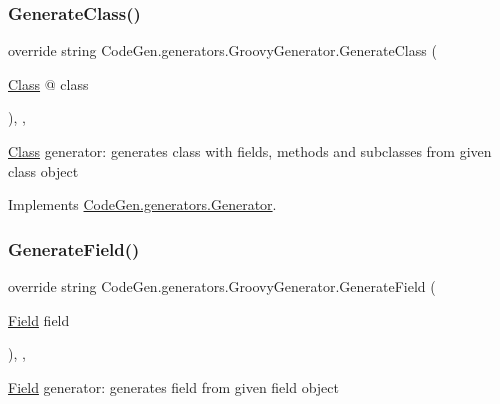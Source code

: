 \subsubsection{\texorpdfstring{Generate\+Class()}{GenerateClass()}}
{\footnotesize\ttfamily override string Code\+Gen.\+generators.\+Groovy\+Generator.\+Generate\+Class (\begin{DoxyParamCaption}\item[{\mbox{\hyperlink{classCodeGen_1_1generators_1_1Class}{Class}} @}]{class }\end{DoxyParamCaption})\hspace{0.3cm}{\ttfamily [inline]}, {\ttfamily [protected]}, {\ttfamily [virtual]}}



\mbox{\hyperlink{classCodeGen_1_1generators_1_1Class}{Class}} generator\+: generates class with fields, methods and subclasses from given class object  



Implements \mbox{\hyperlink{classCodeGen_1_1generators_1_1Generator_a8847fd8b6d408a0dfc087dcc1dc58340}{Code\+Gen.\+generators.\+Generator}}.

\mbox{\label{classCodeGen_1_1generators_1_1GroovyGenerator_a8ccffd1ee31dfad7f7599ab0bca0dc6b}} 
\subsubsection{\texorpdfstring{Generate\+Field()}{GenerateField()}}
{\footnotesize\ttfamily override string Code\+Gen.\+generators.\+Groovy\+Generator.\+Generate\+Field (\begin{DoxyParamCaption}\item[{\mbox{\hyperlink{classCodeGen_1_1generators_1_1Field}{Field}}}]{field }\end{DoxyParamCaption})\hspace{0.3cm}{\ttfamily [inline]}, {\ttfamily [protected]}, {\ttfamily [virtual]}}



\mbox{\hyperlink{classCodeGen_1_1generators_1_1Field}{Field}} generator\+: generates field from given field object  



